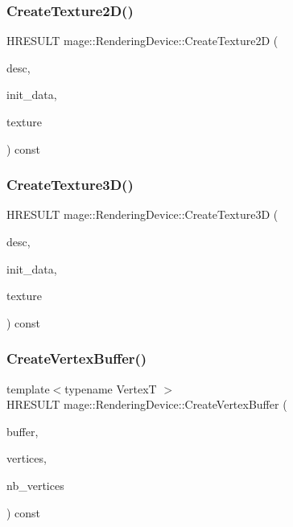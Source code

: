 \subsubsection{\texorpdfstring{Create\+Texture2\+D()}{CreateTexture2D()}}
{\footnotesize\ttfamily H\+R\+E\+S\+U\+LT mage\+::\+Rendering\+Device\+::\+Create\+Texture2D (\begin{DoxyParamCaption}\item[{const D3\+D11\+\_\+\+T\+E\+X\+T\+U\+R\+E2\+D\+\_\+\+D\+E\+SC $\ast$}]{desc,  }\item[{const D3\+D11\+\_\+\+S\+U\+B\+R\+E\+S\+O\+U\+R\+C\+E\+\_\+\+D\+A\+TA $\ast$}]{init\+\_\+data,  }\item[{I\+D3\+D11\+Texture2D $\ast$$\ast$}]{texture }\end{DoxyParamCaption}) const}

\hypertarget{classmage_1_1_rendering_device_aff694666ec6041b49c60e898e0528a9b}{}\label{classmage_1_1_rendering_device_aff694666ec6041b49c60e898e0528a9b} 
\subsubsection{\texorpdfstring{Create\+Texture3\+D()}{CreateTexture3D()}}
{\footnotesize\ttfamily H\+R\+E\+S\+U\+LT mage\+::\+Rendering\+Device\+::\+Create\+Texture3D (\begin{DoxyParamCaption}\item[{const D3\+D11\+\_\+\+T\+E\+X\+T\+U\+R\+E3\+D\+\_\+\+D\+E\+SC $\ast$}]{desc,  }\item[{const D3\+D11\+\_\+\+S\+U\+B\+R\+E\+S\+O\+U\+R\+C\+E\+\_\+\+D\+A\+TA $\ast$}]{init\+\_\+data,  }\item[{I\+D3\+D11\+Texture3D $\ast$$\ast$}]{texture }\end{DoxyParamCaption}) const}

\hypertarget{classmage_1_1_rendering_device_ad9052f9765f41681969d2935d96dbfbb}{}\label{classmage_1_1_rendering_device_ad9052f9765f41681969d2935d96dbfbb} 
\subsubsection{\texorpdfstring{Create\+Vertex\+Buffer()}{CreateVertexBuffer()}}
{\footnotesize\ttfamily template$<$typename VertexT $>$ \\
H\+R\+E\+S\+U\+LT mage\+::\+Rendering\+Device\+::\+Create\+Vertex\+Buffer (\begin{DoxyParamCaption}\item[{I\+D3\+D11\+Buffer $\ast$$\ast$}]{buffer,  }\item[{const VertexT $\ast$}]{vertices,  }\item[{size\+\_\+t}]{nb\+\_\+vertices }\end{DoxyParamCaption}) const}


